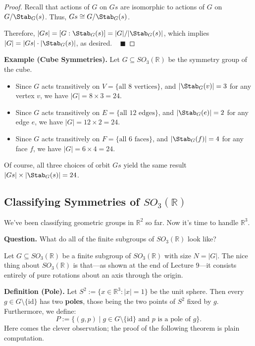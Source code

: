 \begin{proof}
    Recall that actions of $G$ on $Gs$ are isomorphic to actions of $G$ on $G / \Stab_G(s)$.  Thus, $Gs \cong G/\Stab_G(s)$.
    
    Therefore, $|Gs| = [G : \Stab_G(s)] = |G| / |\Stab_G(s)|$, which implies $|G| = |Gs| \cdot |\Stab_G(s)|$,
    as desired. ~ $\blacksquare$
\end{proof}

\textbf{Example (Cube Symmetries).} Let $G \subseteq SO_3(\mathbb{R})$ be the symmetry group of the cube.
\begin{itemize}
    \item Since $G$ acts transitively on $V = \{\text{all $8$ vertices}\}$, and $|\Stab_G(v)| = 3$ for any vertex $v$, we have $|G| = 8 \times 3 = 24$.
    \item Since $G$ acts transitively on $E = \{\text{all $12$ edges}\}$, and $|\Stab_G(e)| = 2$ for any edge $e$, we have $|G| = 12 \times 2 = 24$.
    \item Since $G$ acts transitively on $F = \{\text{all $6$ faces}\}$, and $|\Stab_G(f)| = 4$ for any face $f$, we have $|G| = 6 \times 4 = 24$.
\end{itemize}
Of course, all three choices of orbit $Gs$ yield the same result $|Gs| \times |\Stab_G(s)| = 24$.

\subsection{Classifying Symmetries of $SO_3(\mathbb{R})$}

We've been classifying geometric groups in $\mathbb{R}^2$ so far.  Now it's time to handle $\mathbb{R}^3$. \vspace{0.1cm}

\begin{boxed-text}[36em]
\textbf{Question.} What do all of the finite subgroups of $SO_3(\mathbb{R})$ look like?
\end{boxed-text}

Let $G \subseteq SO_3(\mathbb{R})$ be a finite subgroup of $SO_3(\mathbb{R})$ with size $N = |G|$.  The nice thing about $SO_3(\mathbb{R})$ is that---as shown at the end of Lecture 9---it consists entirely of pure rotations about an axis through the origin.

\textbf{Definition (Pole).} Let $S^2 := \{x \in \mathbb{R}^3: |x| = 1\}$ be the unit sphere.  Then every $g \in G \setminus \{\mathrm{id}\}$ has two \textbf{poles}, those being the two points of $S^2$ fixed by $g$.  Furthermore, we define:
\[ P := \{(g, p) \mid g \in G \setminus \{\mathrm{id}\} \text{ and } p \text{ is a pole of } g\}. \]
Here comes the clever observation; the proof of the following theorem is plain computation.

